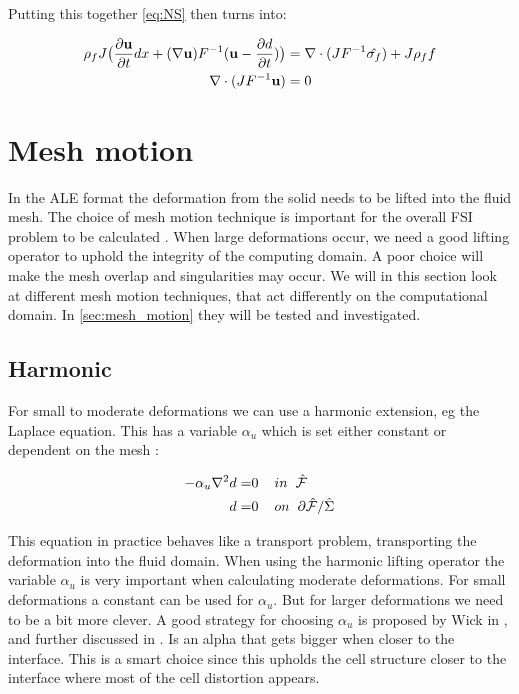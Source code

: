 Putting this together \eqref{eq:NS} then turns into:

\begin{align}
\label{eq:NS_mapped}
\rho_f J \big( \frac{\partial \bold{u}}{\partial t} dx + (\nabla \bold{u})F^{-1}(\bold{u}-\frac{\partial d}{\partial t}) \big) &= \nabla \cdot( J F^{-1} \hat{\sigma_f} ) + J \rho_f f \\
\nabla \cdot (J F^{-1} \bold{u} ) &= 0
\end{align} 

\section{Mesh motion}\label{sec:meshmotion}
In the ALE format the deformation from the solid needs to be lifted into the fluid mesh. The choice of mesh motion technique is important for the overall FSI problem to be calculated \cite{Wick2011a}. When large deformations occur, we need a good lifting operator to uphold the integrity of the computing domain. A poor choice will make the mesh overlap and singularities may occur. We will in this section look at different mesh motion techniques, that act differently on the computational domain. In \ref{sec:mesh_motion} they will be tested and investigated.

\subsection{Harmonic}
For small to moderate deformations we can use a harmonic extension, eg the Laplace equation. This has a variable	 $\alpha_u$ which is set either constant or dependent on the mesh : 

\begin{align}
 - \alpha_u \nabla^2 d =& 0\hspace{4mm} in \hspace{2mm} \hat{\mathcal{F}}\\
  \hspace{4mm} d =& 0 \hspace{4mm } on \hspace{2mm }  \partial \hat{\mathcal{F}} / \hat{\Sigma}
\end{align}

This equation in practice behaves like a transport problem, transporting the deformation into the fluid domain.
When using the harmonic lifting operator the variable $\alpha_u$ is very important when calculating moderate deformations. For small deformations a constant can be used for $\alpha_u$. But for larger deformations we need to be a bit more clever. A good strategy for choosing $\alpha_u$ is proposed by Wick in \cite{Wick2011a}, and further discussed in \cite{Stein2003}. Is an alpha that gets bigger when closer to the interface. This is a smart choice since this upholds the cell structure closer to the interface where most of the cell distortion appears.

